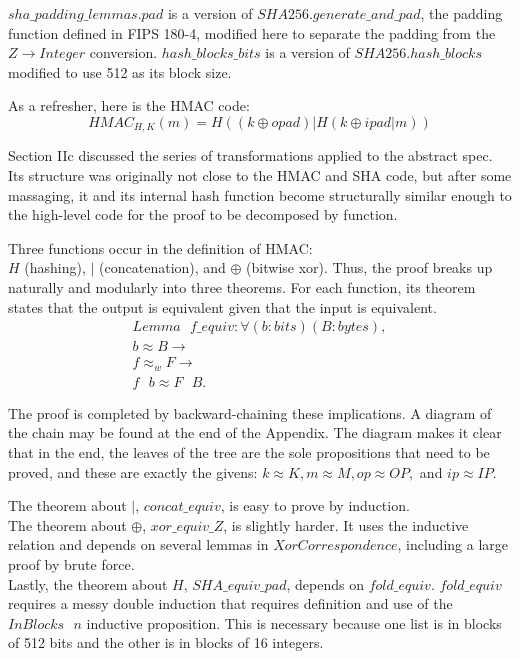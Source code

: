 \documentclass[twocolumn,showpacs,%
  nofootinbib,aps,superscriptaddress,%
  eqsecnum,prd,notitlepage,showkeys,10pt]{revtex4-1}
\newcommand{\eqn}[1] {\begin{gather*}#1\end{gather*}}
\newcommand{\spc} {\textrm{ }}
\newcommand{\s} {\textrm{ }}
\begin{document}
$sha\_padding\_lemmas.pad$ is a version of $SHA256.generate\_and\_pad$, the padding function defined in FIPS 180-4, modified here to separate the padding from the $Z \rightarrow Integer$ conversion. $hash\_blocks\_bits$ is a version of $SHA256.hash\_blocks$ modified to use 512 as its block size. 	

As a refresher, here is the HMAC code:
$$HMAC_{H, K}(m) = H ( (k \oplus opad) | H ( k \oplus ipad | m )  ) $$

Section IIc discussed the series of transformations applied to the abstract spec. Its structure was originally not close to the HMAC and SHA code, but after some massaging, it and its internal hash function become structurally similar enough to the high-level code for the proof to be  decomposed by function.

Three functions occur in the definition of HMAC: \\ $H$ (hashing), $|$ (concatenation), and $\oplus$ (bitwise xor). Thus, the proof breaks up naturally and modularly into three theorems. For each function, its theorem states that the output is equivalent given that the input is equivalent. 
\eqn{
Lemma \s f\_equiv : \forall (b : bits) (B : bytes), \\
b \approx B \rightarrow  \\
f \approx_w F \rightarrow \\
f \spc b \approx F \spc B.}

The proof is completed by backward-chaining these implications. A diagram of the chain may be found at the end of the Appendix. The diagram makes it clear that in the end, the leaves of the tree are the sole propositions that need to be proved, and these are exactly the givens: $k \approx K, m \approx M, op \approx OP,$ and $ip \approx IP$.

The theorem about $|$, $concat\_equiv$, is easy to prove by induction. \\
\indent
The theorem about $\oplus$, $xor\_equiv\_Z$, is slightly harder. It uses the inductive relation and depends on several lemmas in $XorCorrespondence$, including a large proof by brute force. \\
\indent
Lastly, the theorem about $H$, $SHA\_equiv\_pad$, depends on $fold\_equiv$. $fold\_equiv$ requires a messy double induction that requires definition and use of the $InBlocks \s n$ inductive proposition. This is necessary because one list is in blocks of 512 bits and the other is in blocks of 16 integers.
\end{document}
